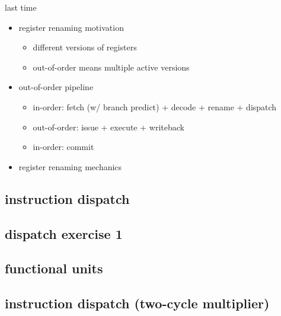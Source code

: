 \date{}
\title{}
\date{}

\begin{frame}
    \titlepage
\end{frame}

\usetikzlibrary{circuits.logic.mux}




\begin{frame}{last time}
    \begin{itemize}
    \item register renaming motivation
        \begin{itemize}
        \item different versions of registers
        \item out-of-order means multiple active versions
        \end{itemize}
    \item out-of-order pipeline
        \begin{itemize}
        \item in-order: fetch (w/ branch predict) + decode + rename + dispatch
        \item out-of-order: issue + execute + writeback
        \item in-order: commit
        \end{itemize}
    \item register renaming mechanics
    \end{itemize}
\end{frame}


\subsection{instruction dispatch}


\subsection{dispatch exercise 1}


\subsection{functional units}


\subsection{instruction dispatch (two-cycle multiplier)}


